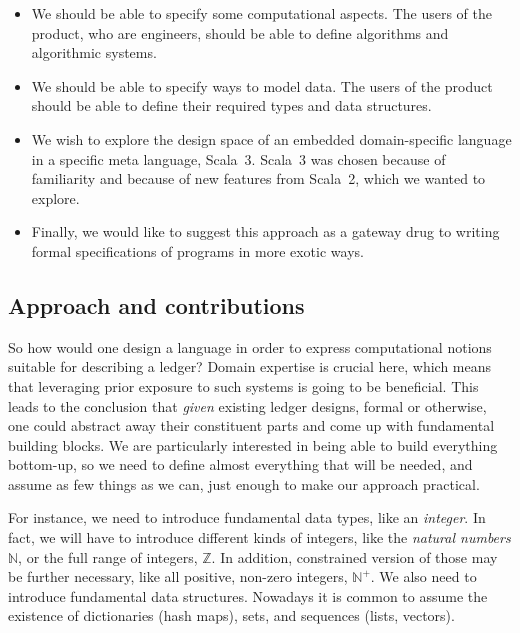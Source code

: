 \documentclass[11pt]{article}
\begin{document}
\begin{itemize}
  \item We should be able to specify some computational aspects. The users of the product, who are engineers, should be able to define algorithms and algorithmic systems.

  \item We should be able to specify ways to model data. The users of the product should be able to define their required types and data structures.
  
  \item We wish to explore the design space of an embedded domain-specific language in a specific meta language, Scala~3. Scala~3 was chosen because of familiarity and because of new features from Scala~2, which we wanted to explore.
  
  \item Finally, we would like to suggest this approach as a gateway drug to writing formal specifications of programs in more exotic ways.
\end{itemize}


\subsection{Approach and contributions}
\label{sec:approach}

So how would one design a language in order to express computational notions suitable for describing a ledger? Domain expertise is crucial here, which means that leveraging prior exposure to such systems is going to be beneficial. This leads to the conclusion that \textit{given} existing ledger designs, formal or otherwise, one could abstract away their constituent parts and come up with fundamental building blocks. We are particularly interested in being able to build everything bottom-up, so we need to define almost everything that will be needed, and assume as few things as we can, just enough to make our approach practical.

For instance, we need to introduce fundamental data types, like an \textit{integer}. In fact, we will have to introduce different kinds of integers, like the \textit{natural numbers} $\mathbb{N}$, or the full range of integers, $\mathbb{Z}$. In addition, constrained version of those may be further necessary, like all positive, non-zero integers, $\mathbb{N}^+$. We also need to introduce fundamental data structures. Nowadays it is common to assume the existence of dictionaries (hash maps), sets, and sequences (lists, vectors). 
\end{document}
